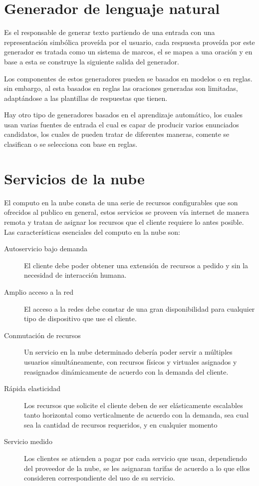         \section{Generador de lenguaje natural}
            Es el responsable de generar texto partiendo de una entrada con una representación simbólica proveída por el usuario, cada respuesta proveída por este generador es tratada como un sistema de marcos, el se mapea a una oración y en base a esta se construye la siguiente salida del generador.
            
            Los componentes de estos generadores pueden se basados en modelos o en reglas. sin embargo, al esta basados en reglas las oraciones generadas son limitadas, adaptándose a las plantillas de respuestas que tienen.
            
            Hay otro tipo de generadores basados en el aprendizaje automático, los cuales usan varias fuentes de entrada el cual es capar de producir varios enunciados candidatos, los cuales de pueden tratar de diferentes maneras, comente se clasifican o se selecciona con base en reglas.
            
            
        
    

\section{Servicios de la nube}

    El computo en la nube consta de una serie de recursos configurables que son ofrecidos al publico en general, estos servicios se proveen vía internet de manera remota y tratan de asignar los recursos que el cliente requiere lo antes posible. \\
    
    Las características esenciales del computo en la nube son:
    \begin{description}
        \item[Autoservicio bajo demanda] El cliente debe poder obtener una extensión de recursos a pedido y sin la necesidad de interacción humana.
        \item[Amplio acceso a la red]  El acceso a la redes debe constar de una gran disponibilidad para cualquier tipo de dispositivo que use el cliente.
        \item[Conmutación de recursos] Un servicio en la nube determinado debería poder servir a múltiples usuarios simultáneamente, con recursos físicos y virtuales asignados y reasignados dinámicamente de acuerdo con la demanda del cliente. 
        \item[Rápida elasticidad] Los recursos que solicite el cliente deben de ser elásticamente escalables tanto horizontal como verticalmente de acuerdo con la demanda, sea cual sea la cantidad de recursos requeridos, y en cualquier momento
        \item[Servicio medido] Los clientes se atienden a pagar por cada servicio que usan, dependiendo del proveedor de la nube, se les asignaran tarifas de acuerdo a lo que ellos consideren correspondiente del uso de su servicio.
    \end{description}

